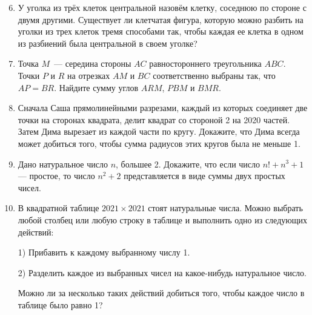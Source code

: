 \documentclass{article}
\begin{document}
    \begin{enumerate}[label*=8.{\arabic{enumi}}]
        \setcounter{enumi}{5}
        \item У уголка из трёх клеток центральной назовём клетку, соседнюю по стороне с двумя другими.
        Существует ли клетчатая фигура, которую можно разбить на уголки из трех клеток тремя способами так, чтобы каждая ее клетка в одном из разбиений была центральной в своем уголке?
        \item Точка $M$~--- середина стороны $AC$ равностороннего треугольника $ABC$.
        Точки $P$ и $R$ на отрезках $AM$ и $BC$ соответственно выбраны так, что $AP = BR$.
        Найдите сумму углов $ARM$, $PBM$ и $BMR$.
        \item Сначала Саша прямолинейными разрезами, каждый из которых соединяет две точки на сторонах квадрата, делит квадрат со стороной 2 на 2020 частей.
        Затем Дима вырезает из каждой части по кругу.
        Докажите, что Дима всегда может добиться того, чтобы сумма радиусов этих кругов была не меньше 1.
        \item Дано натуральное число $n$, большее 2.
        Докажите, что если число $n!+n^3+1$ — простое, то число $n^2+2$ представляется в виде суммы двух простых чисел.
        \item В квадратной таблице $2021 \times 2021$ стоят натуральные числа.
        Можно выбрать любой столбец или любую строку в таблице и выполнить одно из следующих действий:

        1) Прибавить к каждому выбранному числу 1.

        2) Разделить каждое из выбранных чисел на какое-нибудь натуральное число.

        Можно ли за несколько таких действий добиться того, чтобы каждое число в таблице было равно 1?

    \end{enumerate}
\end{document}
